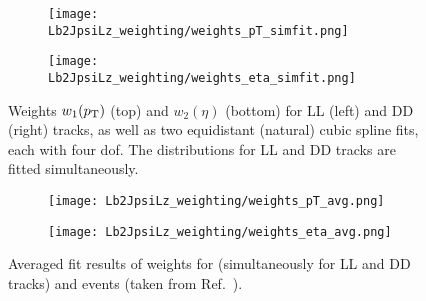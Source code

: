 %
\begin{figure}[htbp]
    \begin{subfigure}{\textwidth}
        \centering
        \texttt{[image: Lb2JpsiLz\_weighting/weights\_pT\_simfit.png]}
    \end{subfigure}
    \par\bigskip 
    \begin{subfigure}{\textwidth}
        \centering
        \texttt{[image: Lb2JpsiLz\_weighting/weights\_eta\_simfit.png]}
    \end{subfigure}
    \caption{Weights $w_1(\mbox{$p_{\mathrm{ T}}$})$ (top) and $w_2(\eta)$ (bottom) for \gls{LL} (left) and \gls{DD} (right) tracks, as well as two equidistant (natural) cubic spline fits, each with four \gls{dof}. The distributions for \gls{LL} and \gls{DD} tracks are fitted simultaneously.}
    \label{fig:LbToJpsiLz_weights_simfit}
\end{figure}

\begin{figure}[htbp]
    \begin{subfigure}{\textwidth}
        \centering
        \texttt{[image: Lb2JpsiLz\_weighting/weights\_pT\_avg.png]}
    \end{subfigure}
    \par\bigskip 
    \begin{subfigure}{\textwidth}
        \centering
        \texttt{[image: Lb2JpsiLz\_weighting/weights\_eta\_avg.png]}
    \end{subfigure}
    \caption{Averaged fit results of weights for \decay{\Lb}{\jpsi\Lz} (simultaneously for \gls{LL} and \gls{DD} tracks) and \decay{\Lb}{\Dz\proton\Km} events (taken from Ref.~\cite{hviemann}).}
    \label{fig:LbToJpsiLz_weights_avg}
\end{figure}


